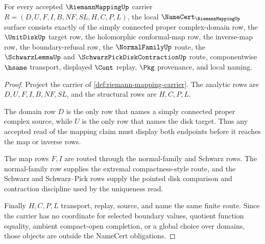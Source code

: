 \begin{theorem}
\label{thm:riemann-mapping-namecert-obligations}
For every accepted $\RiemannMappingUp$ carrier $R=(D,U,F,I,B,NF,SL,H,C,P,L)$, the local $\NameCert_{\RiemannMappingUp}$ surface consists exactly of the simply connected proper complex-domain row, the $\UnitDiskUp$ target row, the holomorphic conformal-map row, the inverse-map row, the boundary-refusal row, the $\NormalFamilyUp$ route, the $\SchwarzLemmaUp$ and $\SchwarzPickDiskContractionUp$ route, componentwise $\hsame$ transport, displayed $\Cont$ replay, $\Pkg$ provenance, and local naming.
\end{theorem}
\begin{proof}
Project the carrier of \autoref{def:riemann-mapping-carrier}. The analytic rows are $D,U,F,I,B,NF,SL$, and the structural rows are $H,C,P,L$.

The domain row $D$ is the only row that names a simply connected proper complex source, while $U$ is the only row that names the disk target. Thus any accepted read of the mapping claim must display both endpoints before it reaches the map or inverse rows.

The map rows $F,I$ are routed through the normal-family and Schwarz rows. The normal-family row supplies the extremal compactness-style route, and the Schwarz and Schwarz--Pick rows supply the pointed disk comparison and contraction discipline used by the uniqueness read.

Finally $H,C,P,L$ transport, replay, source, and name the same finite route. Since the carrier has no coordinate for selected boundary values, quotient function equality, ambient compact-open completion, or a global choice over domains, those objects are outside the NameCert obligations.
\end{proof}

